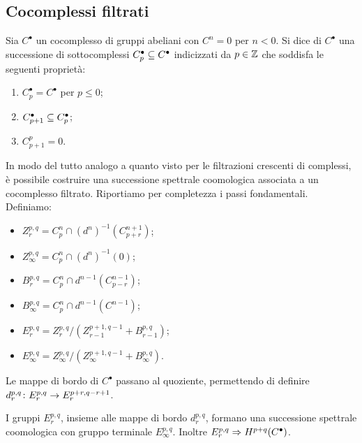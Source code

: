 \subsection{Cocomplessi filtrati}
\begin{definition}
Sia \(C^\bullet\) un cocomplesso di gruppi abeliani con \(C^n=0\) per \(n<0\). Si dice  di \(C^\bullet\) una successione di sottocomplessi \(C_p^\bullet\subseteq C^\bullet\) indicizzati da \(p\in\mathbb{Z}\) che soddisfa le seguenti proprietà:
\begin{enumerate}
\item \(C_p^\bullet=C^\bullet\) per \(p\le 0\);
\item \(C_{p+1}^\bullet\subseteq C_p^\bullet\);
\item \(C^p_{p+1}=0\).
\end{enumerate}
\end{definition}
In modo del tutto analogo a quanto visto per le filtrazioni crescenti di complessi, è possibile costruire una successione spettrale coomologica associata a un cocomplesso filtrato. Riportiamo per completezza i passi fondamentali. Definiamo:
\begin{itemize}
\item \(Z^{p,q}_r=C_p^n\cap (d^n)^{-1}(C_{p+r}^{n+1})\);
\item \(Z^{p,q}_\infty=C_p^n\cap(d^n)^{-1}(0)\);
\item \(B^{p,q}_r=C_p^n\cap d^{n-1}(C_{p-r}^{n-1})\);
\item \(B^{p,q}_\infty=C_p^n\cap d^{n-1}(C^{n-1})\);
\item \(E^{p,q}_r=Z^{p,q}_r/(Z^{p+1,q-1}_{r-1}+B^{p,q}_{r-1})\);
\item \(E^{p,q}_\infty=Z^{p,q}_\infty/(Z^{p+1,q-1}_{\infty}+B^{p,q}_\infty)\).
\end{itemize}
Le mappe di bordo di \(C^\bullet\) passano al quoziente, permettendo di definire  \(\map{d^{p,q}_r}{E^{p,q}_r}{E^{p+r,q-r+1}_r}\).
\begin{proposition}
I gruppi \(E^{p,q}_r\), insieme alle mappe di bordo \(d^{p,q}_r\), formano una successione spettrale coomologica con gruppo terminale \(E^{p,q}_\infty\). Inoltre \(E^{p,q}_r\Rightarrow H^{p+q}(C^\bullet)\).
\end{proposition}

